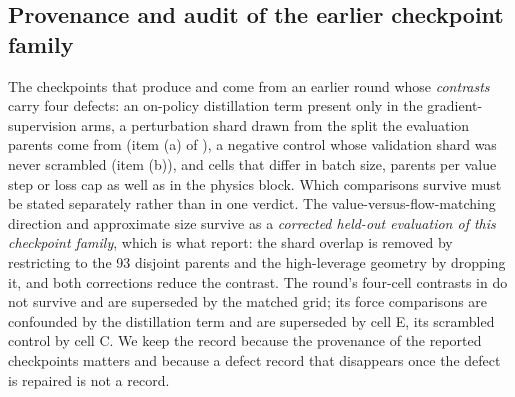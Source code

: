 \subsection{Provenance and audit of the earlier checkpoint family}
\label{app:cells}

The checkpoints that produce  and 
come from an earlier round whose \emph{contrasts} carry four
defects: an on-policy distillation term present only in the gradient-supervision arms,
a perturbation shard drawn from the split the evaluation parents come from (item (a) of
), a negative control whose validation shard was never scrambled
(item (b)), and cells that differ in batch size, parents per value step or loss cap as
well as in the physics block. Which comparisons survive must be stated separately
rather than in one verdict. The value-versus-flow-matching direction and approximate
size survive as a \emph{corrected held-out evaluation of this checkpoint family}, which
is what  report: the shard overlap is
removed by restricting to the 93 disjoint parents and the high-leverage geometry by
dropping it, and both corrections reduce the contrast. The round's four-cell contrasts
in  do not survive and are superseded by the matched grid; its force
comparisons are confounded by the distillation term and are superseded by cell E, its
scrambled control by cell C. We keep the record because the provenance of the reported
checkpoints matters and because a defect record that disappears once the defect is
repaired is not a record.

